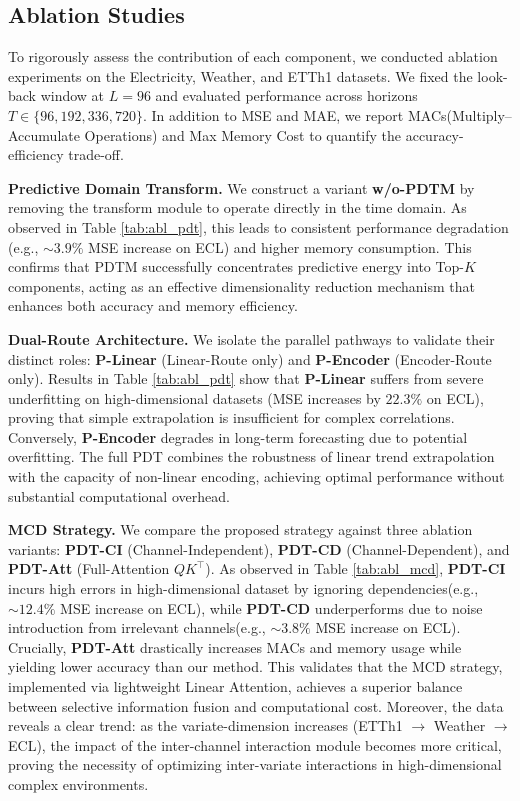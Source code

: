 \documentclass[final,3p,times]{elsarticle}
\begin{document}
\subsection{Ablation Studies}

To rigorously assess the contribution of each component, we conducted ablation experiments on the Electricity, Weather, and ETTh1 datasets. We fixed the look-back window at $L=96$ and evaluated performance across horizons $T \in \{96, 192, 336, 720\}$. In addition to MSE and MAE, we report MACs(Multiply–Accumulate Operations) and Max Memory Cost to quantify the accuracy-efficiency trade-off.

\textbf{Predictive Domain Transform.} We construct a variant \textbf{w/o-PDTM} by removing the transform module to operate directly in the time domain. As observed in Table \ref{tab:abl_pdt}, this leads to consistent performance degradation (e.g., $\sim 3.9\%$ MSE increase on ECL) and higher memory consumption. This confirms that PDTM successfully concentrates predictive energy into Top-$K$ components, acting as an effective dimensionality reduction mechanism that enhances both accuracy and memory efficiency.

\textbf{Dual-Route Architecture.} We isolate the parallel pathways to validate their distinct roles: \textbf{P-Linear} (Linear-Route only) and \textbf{P-Encoder} (Encoder-Route only). Results in Table \ref{tab:abl_pdt} show that \textbf{P-Linear} suffers from severe underfitting on high-dimensional datasets (MSE increases by $22.3\%$ on ECL), proving that simple extrapolation is insufficient for complex correlations. Conversely, \textbf{P-Encoder} degrades in long-term forecasting due to potential overfitting. The full PDT combines the robustness of linear trend extrapolation with the capacity of non-linear encoding, achieving optimal performance without substantial computational overhead.

\textbf{MCD Strategy.} We compare the proposed strategy against three ablation variants: \textbf{PDT-CI} (Channel-Independent), \textbf{PDT-CD} (Channel-Dependent), and \textbf{PDT-Att} (Full-Attention $QK^\top$). As observed in Table \ref{tab:abl_mcd}, \textbf{PDT-CI} incurs high errors in high-dimensional dataset by ignoring dependencies(e.g., $\sim 12.4\%$ MSE increase on ECL), while \textbf{PDT-CD} underperforms due to noise introduction from irrelevant channels(e.g., $\sim 3.8\%$ MSE increase on ECL). Crucially, \textbf{PDT-Att} drastically increases MACs and memory usage while yielding lower accuracy than our method. This validates that the MCD strategy, implemented via lightweight Linear Attention, achieves a superior balance between selective information fusion and computational cost. Moreover, the data reveals a clear trend: as the variate-dimension increases (ETTh1 $\to$ Weather $\to$ ECL), the impact of the inter-channel interaction module becomes more critical, proving the necessity of optimizing inter-variate interactions in high-dimensional complex environments.
\end{document}
